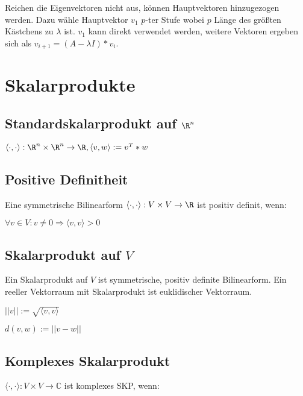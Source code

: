 Reichen die Eigenvektoren nicht aus, können Hauptvektoren hinzugezogen werden. Dazu wähle Hauptvektor $v_1$ $p$-ter Stufe wobei $p$ Länge des größten Kästchens zu $\lambda$ ist. $v_1$ kann direkt verwendet werden, weitere Vektoren ergeben sich als $v_{i+1} = (A-\lambda I)*v_i$.

\section*{Skalarprodukte}

\subsection*{Standardskalarprodukt auf $\R^n$}

$\langle \cdot, \cdot \rangle : \R^n \times \R^n \rightarrow \R, \langle v, w \rangle := v^T * w$

\subsection*{Positive Definitheit}

Eine symmetrische Bilinearform $\langle \cdot, \cdot \rangle : V \times V \rightarrow \R$ ist positiv definit, wenn:

$\forall v \in V: v \neq 0 \Rightarrow \langle v, v \rangle > 0$

\subsection*{Skalarprodukt auf $V$}

Ein Skalarprodukt auf $V$ ist symmetrische, positiv definite Bilinearform. Ein reeller Vektorraum mit Skalarprodukt ist euklidischer Vektorraum.

\begin{description}[leftmargin=!,labelwidth=10mm]
	\item[Norm]   $||v|| := \sqrt{\langle v, v \rangle}$
	\item[Metrik] $d(v, w) := ||v - w||$
\end{description}

\subsection*{Komplexes Skalarprodukt}

$\langle \cdot, \cdot \rangle : V \times V \rightarrow \mathbb{C}$ ist komplexes SKP, wenn:


